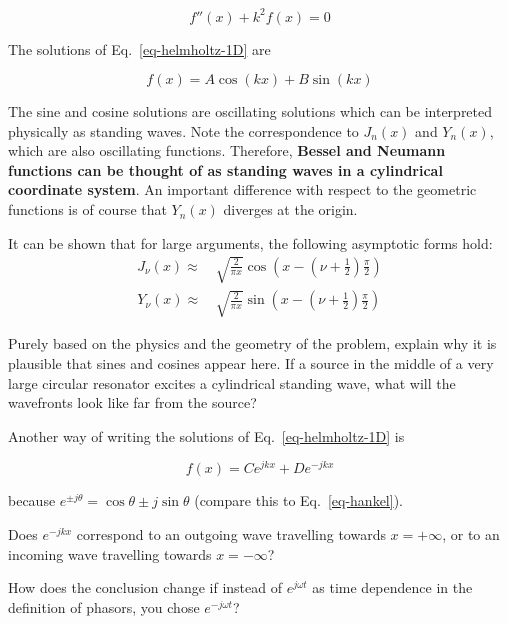\begin{equation}
f''(x) + k^2 f(x) = 0 \label{eq-helmholtz-1D}
\end{equation} 

The solutions of Eq.~\ref{eq-helmholtz-1D} are

\begin{equation}
f(x) = A \cos(kx) + B \sin(kx)
\end{equation} 

The sine and cosine solutions are oscillating solutions which can be interpreted physically as standing waves. Note the correspondence to $J_n(x)$ and $Y_n(x)$, which are also oscillating functions. Therefore, \textbf{Bessel and Neumann functions can be thought of as standing waves in a cylindrical coordinate system}. An important difference with respect to the geometric functions is of course that $Y_n(x)$ diverges at the origin.

\begin{exer}
  It can be shown that for large arguments, the following asymptotic forms hold:
\begin{align}
J_\nu(x) \approx & \, \sqrt{\frac{2}{\pi x}} \cos \left( x - \left(\nu + \frac{1}{2}\right)\frac{\pi}{2} \right) \nonumber \\
Y_\nu(x) \approx & \, \sqrt{\frac{2}{\pi x}} \sin \left( x - \left(\nu + \frac{1}{2}\right) \frac{\pi}{2} \right)   
\end{align}

Purely based on the physics and the geometry of the problem, explain why it is plausible that sines and cosines appear here. If a source in the middle of a very large circular resonator excites a cylindrical standing wave, what will the wavefronts look like far from the source?

\end{exer}

Another way of writing the solutions of Eq.~\ref{eq-helmholtz-1D} is

\begin{equation}
f(x) = C e^{jkx} + D e^{-jkx}
\end{equation} 

because $e^{\pm j \theta} = \cos \theta \pm j \sin \theta$ (compare this to Eq.~\ref{eq-hankel}).

\pagebreak

\begin{exer}
Does $e^{-jkx}$ correspond to an outgoing wave travelling towards $x=+\infty$, or to an incoming wave travelling towards $x=-\infty$?

How does the conclusion change if instead of  $e^{j \omega t}$ as time dependence in the definition of phasors, you chose $e^{-j \omega t}$?
\end{exer}


